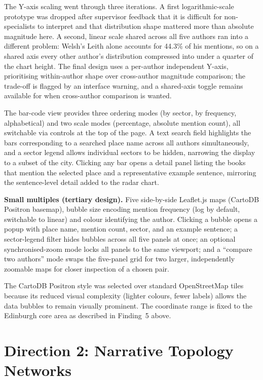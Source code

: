 \documentclass[logo,msc]{infthesis}
\begin{document}
The Y-axis scaling went through three iterations. A first logarithmic-scale prototype was dropped after supervisor feedback that it is difficult for non-specialists to interpret and that distribution shape mattered more than absolute magnitude here. A second, linear scale shared across all five authors ran into a different problem: Welsh's Leith alone accounts for 44.3\% of his mentions, so on a shared axis every other author's distribution compressed into under a quarter of the chart height. The final design uses a per-author independent Y-axis, prioritising within-author shape over cross-author magnitude comparison; the trade-off is flagged by an interface warning, and a shared-axis toggle remains available for when cross-author comparison is wanted.
 
The bar-code view provides three ordering modes (by sector, by frequency, alphabetical) and two scale modes (percentage, absolute mention count), all switchable via controls at the top of the page. A text search field highlights the bars corresponding to a searched place name across all authors simultaneously, and a sector legend allows individual sectors to be hidden, narrowing the display to a subset of the city. Clicking any bar opens a detail panel listing the books that mention the selected place and a representative example sentence, mirroring the sentence-level detail added to the radar chart.
 
\textbf{Small multiples (tertiary design).} Five side-by-side Leaflet.js maps (CartoDB Positron basemap), bubble size encoding mention frequency (log by default, switchable to linear) and colour identifying the author. Clicking a bubble opens a popup with place name, mention count, sector, and an example sentence; a sector-legend filter hides bubbles across all five panels at once; an optional synchronised-zoom mode locks all panels to the same viewport; and a ``compare two authors'' mode swaps the five-panel grid for two larger, independently zoomable maps for closer inspection of a chosen pair.
 
The CartoDB Positron style was selected over standard OpenStreetMap tiles because its reduced visual complexity (lighter colours, fewer labels) allows the data bubbles to remain visually prominent. The coordinate range is fixed to the Edinburgh core area as described in Finding~5 above.
 
\section{Direction 2: Narrative Topology Networks}
\label{sec:direction2}
\label{sec:metro-redesign}
\end{document}
